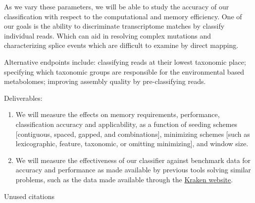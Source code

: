 \documentclass{elsarticle}
\begin{document}
As we vary these parameters, we will be able to study the accuracy of
our classification with respect to the computational and memory
efficiency. One of our goals is the ability to discriminate
transcriptome matches by classify individual reads. Which can aid in
resolving complex mutations and characterizing splice events which are
difficult to examine by direct mapping.

Alternative endpoints include: classifying reads at their lowest
taxonomic place; specifying which taxonomic groups are responsible for
the environmental based metabolomes; improving assembly quality by
pre-classifying reads.

Deliverables:
\begin{enumerate}
\item We will measure the effects on memory requirements, performance, classification accuracy and applicability,
as a function of seeding schemes [contiguous, spaced, gapped, and combinations],
minimizing schemes [such as lexicographic, feature, taxonomic, or omitting minimizing],
and window size.
\item We will measure the effectiveness of our classifier against benchmark data for accuracy
and performance as made available by previous tools solving similar problems, such as the
data made available through the \href{https://ccb.jhu.edu/software/kraken/}{Kraken website}.
\end{enumerate}

\vspace*{3em}



Unused citations~\citep{li2012bioinformatics, chikhi2014recomb,
orenstein2016aib, hahn2016pcb}




\end{document}
